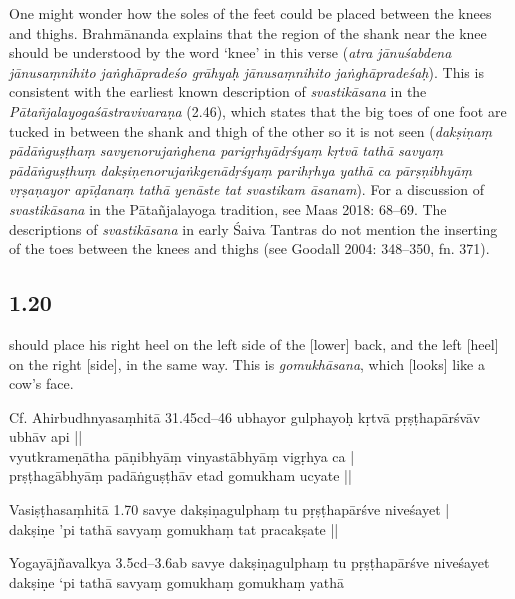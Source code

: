 \begin{ekdosis}
\begin{testimonia}[hp01_019]
\end{testimonia}

\begin{philcomm}[hp01_019]        
One might wonder how the soles of the feet could be placed between the knees and thighs. Brahmānanda explains that the region of the shank near the knee should be understood by the word ‘knee’ in this verse (\emph{atra jānuśabdena jānusaṃnihito jaṅghāpradeśo grāhyaḥ jānusaṃnihito jaṅghāpradeśaḥ}). This is consistent with the earliest known description of \emph{svastikāsana} in the \emph{Pātañjalayogaśāstravivaraṇa} (2.46), which states that the big toes of one foot are tucked in between the shank and thigh of the other so it is not seen (\emph{dakṣiṇaṃ pādāṅguṣṭhaṃ savyenorujaṅghena parigṛhyādṛśyaṃ kṛtvā tathā savyaṃ pādāṅguṣṭhuṃ dakṣiṇenorujaṅkgenādṛśyaṃ parihṛhya yathā ca pārṣṇibhyāṃ vṛṣaṇayor apīḍanaṃ tathā yenāste tat svastikam āsanam}). For a discussion of \emph{svastikāsana} in the Pātañjalayoga tradition, see Maas 2018: 68–69. The descriptions of \emph{svastikāsana} in early Śaiva Tantras do not mention the inserting of the toes between the knees and thighs (see Goodall 2004: 348–350, fn. 371).
\end{philcomm}

\subsection*{1.20}
\begin{translation} should place his right heel on the left side of the [lower] back, and the left [heel] on the right [side], in the same way. This is \emph{gomukhāsana}, which [looks] like a cow's face.
\end{translation}

\begin{sources}[hp01_020]
Cf. Ahirbudhnyasaṃhitā 31.45cd–46
\startverse
ubhayor gulphayoḥ kṛtvā pṛṣṭhapārśvāv ubhāv api ||\\
vyutkrameṇātha pāṇibhyāṃ vinyastābhyāṃ vigṛhya ca |\\
prṣṭhagābhyāṃ padāṅguṣṭhāv etad gomukham ucyate || 
\endverse

Vasiṣṭhasaṃhitā 1.70
\startverse
savye dakṣiṇagulphaṃ tu pṛṣṭhapārśve niveśayet |\\
dakṣiṇe 'pi tathā savyaṃ gomukhaṃ tat pracakṣate ||
\endverse

Yogayājñavalkya 3.5cd–3.6ab
\startverse
savye dakṣiṇagulphaṃ tu pṛṣṭhapārśve niveśayet\\
dakṣiṇe ‘pi tathā savyaṃ gomukhaṃ gomukhaṃ yathā
\endverse
\end{sources}


\end{ekdosis}
